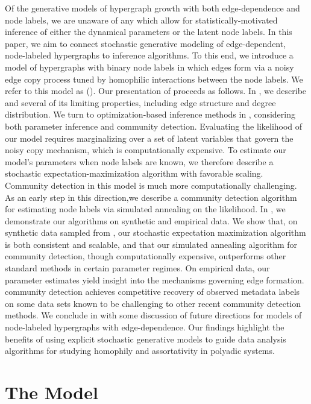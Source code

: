 \documentclass[aps,pre,reprint,superscriptaddress,nofootinbib]{revtex4-2}
\begin{document}
    Of the generative models of hypergraph growth with both edge-dependence and node labels, we are unaware of any which allow for statistically-motivated inference of either the dynamical parameters or the latent node labels.
    In this paper, we aim to connect stochastic generative modeling of edge-dependent, node-labeled hypergraphs to inference algorithms. 
    To this end, we introduce a model of hypergraphs with binary node labels in which edges form via a noisy edge copy process tuned by homophilic interactions between the node labels.
    We refer to this model as \Model{} (\model{}).
    Our presentation of \model{} proceeds as follows.
    In , we describe \model{} and several of its limiting properties, including edge structure and degree distribution.
    We turn to optimization-based inference methods in , considering both parameter inference and community detection.
    Evaluating the likelihood of our model requires marginalizing over a set of latent variables that govern the noisy copy mechanism, which is computationally expensive. 
    To estimate our model's parameters when node labels are known, we therefore describe a stochastic expectation-maximization algorithm with favorable scaling.
    Community detection in this model is much more computationally challenging. 
    As an early step in this direction,we describe a community detection algorithm for estimating node labels via simulated annealing on the \model{} likelihood. 
    In , we demonstrate our algorithms on synthetic and empirical data. 
    We show that, on synthetic data sampled from \model{}, our stochastic expectation maximization algorithm is both consistent and scalable, and that our simulated annealing algorithm for community detection, though computationally expensive, outperforms other standard methods in certain parameter regimes. 
    On empirical data, our parameter estimates yield insight into the mechanisms governing edge formation.
    \model{} community detection achieves competitive recovery of observed metadata labels on some data sets known to be challenging to other recent community detection methods.
    We conclude in  with some discussion of future directions for models of node-labeled hypergraphs with edge-dependence. 
    Our findings highlight the benefits of using explicit stochastic generative models to guide data analysis algorithms for studying homophily and assortativity in polyadic systems.

\section{The \model{} Model} \label{sec:model-description}
\end{document}
